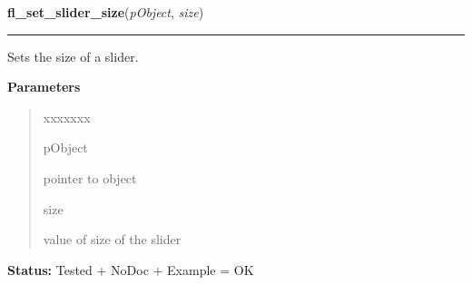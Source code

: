     \label{xformslib:library:fl_set_slider_size}

    \vspace{0.5ex}

\hspace{.8\funcindent}\begin{boxedminipage}{\funcwidth}

    \raggedright \textbf{fl\_set\_slider\_size}(\textit{pObject}, \textit{size})

    \vspace{-1.5ex}

    \rule{\textwidth}{0.5\fboxrule}
\setlength{\parskip}{2ex}
    Sets the size of a slider.

\setlength{\parskip}{1ex}
      \textbf{Parameters}
      \vspace{-1ex}

      \begin{quote}
        \begin{Ventry}{xxxxxxx}

          \item[pObject]

          pointer to object

          \item[size]

          value of size of the slider

        \end{Ventry}

      \end{quote}

\textbf{Status:} Tested + NoDoc + Example = OK



    \end{boxedminipage}

    \label{xformslib:library:fl_set_slider_precision}

    \vspace{0.5ex}

